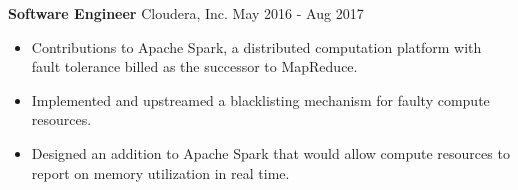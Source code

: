 \textbf{Software Engineer} Cloudera, Inc. \hfill May 2016 - Aug 2017

\begin{itemize} \itemsep -2pt

\item Contributions to Apache Spark, a distributed computation
      platform with fault tolerance billed as the successor to MapReduce.

\item Implemented and upstreamed a blacklisting mechanism for
      faulty compute resources.

\item Designed an addition to Apache Spark that would allow compute resources to
      report on memory utilization in real time.

\end{itemize}
